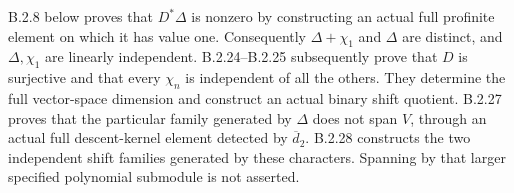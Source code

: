 B.2.8 below proves that $D^*\Delta$ is nonzero by constructing
an actual full profinite element on which it has value one.
Consequently $\Delta+\chi_1$ and $\Delta$ are distinct, and
$\Delta,\chi_1$ are linearly independent. B.2.24--B.2.25
subsequently prove that $D$ is surjective and that every
$\chi_n$ is independent of all the others. They determine
the full vector-space dimension and construct an actual
binary shift quotient. B.2.27 proves that the particular
family generated by $\Delta$ does not span $V$, through
an actual full descent-kernel element detected by
$\overline d_2$. B.2.28 constructs the two independent
shift families generated by these characters. Spanning
by that larger specified polynomial submodule is not
asserted.
